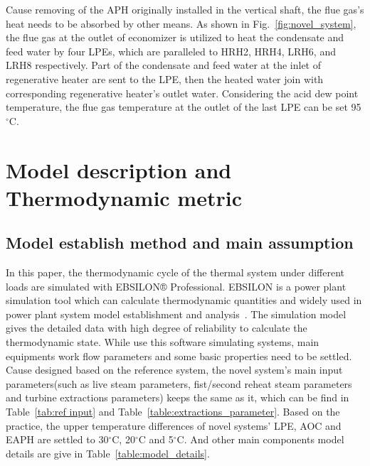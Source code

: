 \documentclass[preprint,12pt]{elsarticle}
\begin{document}
Cause removing of the APH originally installed in the vertical shaft, the flue gas's heat needs to be absorbed by other means.
As shown in Fig.~\ref{fig:novel_system}, the flue gas at the outlet of economizer is utilized to heat the condensate and feed water by four LPEs, which are paralleled to HRH2, HRH4, LRH6, and LRH8 respectively. 
Part of the condensate and feed water at the inlet of regenerative heater are sent to the LPE, then the heated water join with corresponding regenerative heater's outlet water. 
Considering the acid dew point temperature, the flue gas temperature at the outlet of the last LPE can be set 95$^\circ$C. 


\section{Model description and Thermodynamic metric}
\label{ssub:model_establishment_and_system_analysis_method}

\subsection{Model establish method and main assumption}
\label{ssub3:modle description}
In this paper, the thermodynamic cycle of the thermal system under different loads are simulated with EBSILON® Professional.
EBSILON is a power plant simulation tool which can calculate thermodynamic quantities and widely used in power plant system model establishment and analysis~\cite{Li2015Integrated,Yao2017Multi}. 
The simulation model gives the detailed data with high degree of reliability to calculate the thermodynamic state.
While use this software simulating systems, main equipments work flow parameters and some basic properties need to be settled.
Cause designed based on the reference system, the novel system's main input parameters(such as live steam parameters, fist/second reheat steam parameters and turbine extractions parameters) keeps the same as it, which can be find in Table~\ref{tab:ref input} and Table~\ref{table:extractions_parameter}.
Based on the practice, the upper temperature differences of novel systems' LPE, AOC and EAPH are settled to 30$^\circ$C, 20$^\circ$C and 5$^\circ$C. 
And other main components model details are give in Table~\ref{table:model_details}. 
\end{document}
